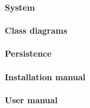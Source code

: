 \large{
\textbf{System}
}

\paragraph{Class diagrams}



\paragraph{Persistence}


\paragraph{Installation manual}


\paragraph{User manual}
